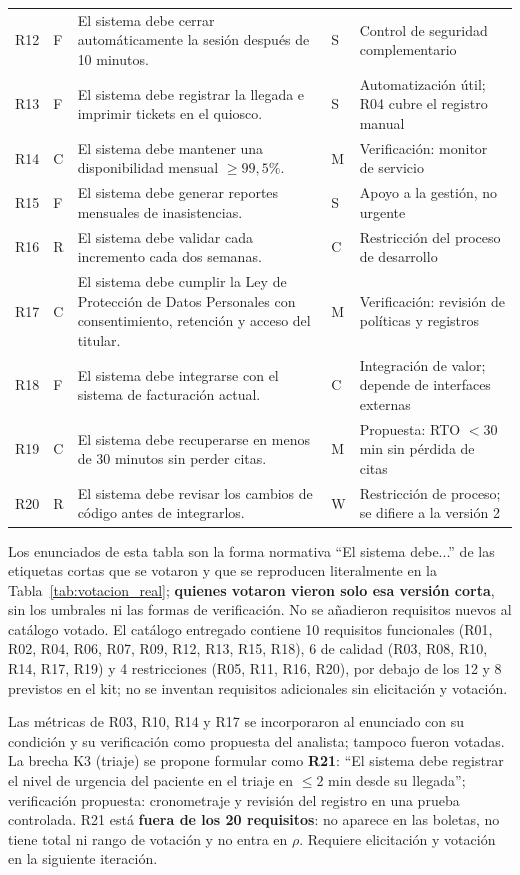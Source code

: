 \begin{table}[htbp]
{\begin{tabular}{@{}p{0.9cm}p{0.9cm}p{4.9cm}p{1.4cm}p{4.2cm}@{}}
R12 & F & El sistema debe cerrar automáticamente la sesión después de 10 minutos. & S & Control de seguridad complementario \\
R13 & F & El sistema debe registrar la llegada e imprimir tickets en el quiosco. & S & Automatización útil; R04 cubre el registro manual \\
R14 & C & El sistema debe mantener una disponibilidad mensual $\ge 99{,}5\%$. & M & Verificación: monitor de servicio \\
R15 & F & El sistema debe generar reportes mensuales de inasistencias. & S & Apoyo a la gestión, no urgente \\
R16 & R & El sistema debe validar cada incremento cada dos semanas. & C & Restricción del proceso de desarrollo \\
R17 & C & El sistema debe cumplir la Ley de Protección de Datos Personales con consentimiento, retención y acceso del titular. & M & Verificación: revisión de políticas y registros \\
R18 & F & El sistema debe integrarse con el sistema de facturación actual. & C & Integración de valor; depende de interfaces externas \\
R19 & C & El sistema debe recuperarse en menos de 30 minutos sin perder citas. & M & Propuesta: RTO $< 30$ min sin pérdida de citas \\
R20 & R & El sistema debe revisar los cambios de código antes de integrarlos. & W & Restricción de proceso; se difiere a la versión 2 \\
\bottomrule
\end{tabular}%
}
\end{table}

Los enunciados de esta tabla son la forma normativa ``El sistema debe...'' de las etiquetas cortas que se votaron y que se reproducen literalmente en la Tabla~\ref{tab:votacion_real}; \textbf{quienes votaron vieron solo esa versión corta}, sin los umbrales ni las formas de verificación. No se añadieron requisitos nuevos al catálogo votado. El catálogo entregado contiene 10 requisitos funcionales (R01, R02, R04, R06, R07, R09, R12, R13, R15, R18), 6 de calidad (R03, R08, R10, R14, R17, R19) y 4 restricciones (R05, R11, R16, R20), por debajo de los 12 y 8 previstos en el kit; no se inventan requisitos adicionales sin elicitación y votación.

Las métricas de R03, R10, R14 y R17 se incorporaron al enunciado con su condición y su verificación como propuesta del analista; tampoco fueron votadas. La brecha K3 (triaje) se propone formular como \textbf{R21}: ``El sistema debe registrar el nivel de urgencia del paciente en el triaje en $\le 2$ min desde su llegada''; verificación propuesta: cronometraje y revisión del registro en una prueba controlada. R21 está \textbf{fuera de los 20 requisitos}: no aparece en las boletas, no tiene total ni rango de votación y no entra en $\rho$. Requiere elicitación y votación en la siguiente iteración.
